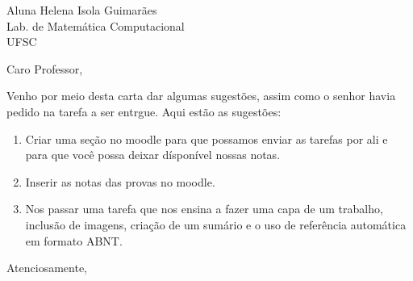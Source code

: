 \documentclass{letter}
\begin{document}
 
\begin{letter}{Aluna Helena Isola Guimarães \\ Lab. de Matemática Computacional\\ UFSC}
\opening{Caro Professor,}

Venho por meio desta carta dar algumas sugestões, assim como o senhor havia pedido na tarefa a ser entrgue.
Aqui estão as sugestões:
\begin{enumerate}
    \item Criar uma seção no moodle para que possamos enviar as tarefas por ali e para que você possa deixar dísponível nossas notas.
    \item Inserir as notas das provas no moodle.
    \item Nos passar uma tarefa que nos ensina a fazer uma capa de um trabalho, inclusão de imagens, criação de um sumário e o uso de referência automática em formato ABNT.
\end{enumerate}

\closing{Atenciosamente,}
 
\end{letter}
\end{document}
